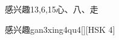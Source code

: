 \begin{entry}{感兴趣}{13,6,15}{⼼、⼋、⾛}
  \begin{phonetics}{感兴趣}{gan3xing4qu4}[][HSK 4]
  \end{phonetics}
\end{entry}
